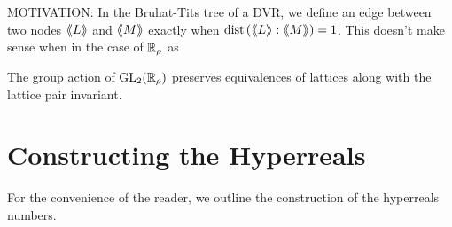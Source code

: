 \documentclass[draft]{amsart}
\DeclareMathOperator{\dist}{dist}
\newcommand{\llangle}{\langle \hspace{-.25em}\langle}
\newcommand{\rrangle}{\rangle \hspace{-.25em}\rangle}
\begin{document}
\newpage



MOTIVATION:
In the Bruhat-Tits tree of a DVR, we define an edge between two nodes \(\llangle L \rrangle\) and \(\llangle M \rrangle\) exactly when \(\dist \p{\llangle L \rrangle : \llangle M \rrangle}=1\). This doesn't make sense when in the case of \(\mathbb{R}_\rho\) as 







\begin{lemma}\label{lemma:action-preserves-edges}
    The group action of \(\mathrm{GL}_2(\mathbb{R}_{\rho})\) preserves equivalences of lattices along with the lattice pair invariant. 
\end{lemma}





    



    



    
    


\newpage

\appendix

\section{Constructing the Hyperreals} \label{section:ConstTheHRs}
For the convenience of the reader, we outline the construction of the hyperreals numbers.
\end{document}
